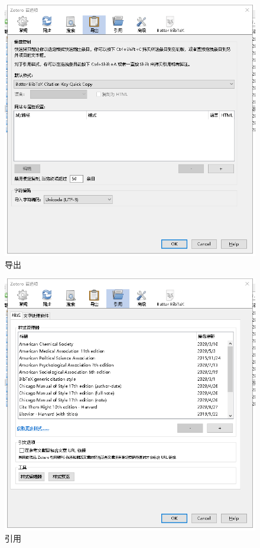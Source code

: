 \begin{figure}
	\centering
	\includegraphics[scale=0.8]{Fig/zotero5.png}
	\caption{\label{op5}导出}
\end{figure}
\begin{figure}
	\centering
	\includegraphics[scale=0.8]{Fig/zotero6.png}
	\caption{\label{op6}引用}
\end{figure}
